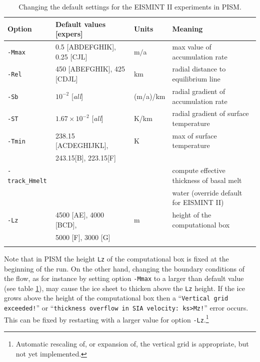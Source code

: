 \documentclass[11pt,final]{amsart}
\begin{document}
\begin{table}[ht]
\caption{Changing the default settings for the EISMINT II experiments in PISM.}\label{tab:eisIIoptions}
\small
\begin{tabular}{@{}llll}\hline
\textbf{Option} & \textbf{Default values [expers]} & \textbf{Units} & \textbf{Meaning} \\ \hline
\verb|-Mmax| & 0.5 [ABDEFGHIK], 0.25 [CJL] & m$/$a & max value of accumulation rate \\
\verb|-Rel| & 450 [ABEFGHIK], 425 [CDJL] & km & radial distance to equilibrium line \\
\verb|-Sb| & $10^{-2}$ [\emph{all}] & (m/a)/km & radial gradient of accumulation rate \\
\verb|-ST| & $1.67 \times 10^{-2}$ [\emph{all}] & K/km & radial gradient of surface temperature\\
\verb|-Tmin| & 238.15 [ACDEGHIJKL], & K & max of surface temperature \\
 & 243.15[B], 223.15[F] & & \\
\verb|-track_Hmelt| &  &  & compute effective thickness of basal melt \\
 &  &  & water (override default for EISMINT II) \\
\verb|-Lz| & 4500 [AE], 4000 [BCD], & m & height of the computational box \\
 & 5000 [F], 3000 [G] &  &  \\
\hline\normalsize
\end{tabular}\end{table}

Note that in PISM the height \verb|Lz| of the computational box is fixed at the beginning of the run.  On the other hand, changing the boundary conditions of the flow, as for instance by setting option \verb|-Mmax| to a larger than default value (see table \ref{tab:eisIIoptions}), may cause the ice sheet to thicken above the \verb|Lz| height.  If the ice grows above the height of the computational box then a ``\verb|Vertical grid exceeded!|'' or ``\verb|thickness overflow in SIA velocity: ks>Mz!|'' error occurs.  This can be fixed by restarting with a larger value for option \verb|-Lz|.\footnote{Automatic rescaling of, or expansion of, the vertical grid is appropriate, but not yet implemented.}
\end{document}
